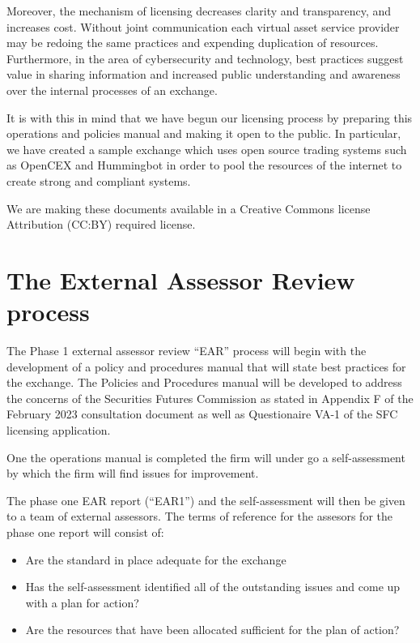 Moreover, the mechanism of licensing decreases clarity and
transparency, and increases cost.  Without joint communication each
virtual asset service provider may be redoing the same practices and
expending duplication of resources.  Furthermore, in the area of
cybersecurity and technology, best practices suggest value in sharing
information and increased public understanding and awareness over the
internal processes of an exchange.

It is with this in mind that we have begun our licensing process by
preparing this operations and policies manual and making it open to
the public.  In particular, we have created a sample exchange which
uses open source trading systems such as OpenCEX and Hummingbot in
order to pool the resources of the internet to create strong and
compliant systems.

We are making these documents available in a Creative Commons license
Attribution (CC:BY) required license.

\section{The External Assessor Review process}

The Phase 1 external assessor review ``EAR'' process will begin with
the development of a policy and procedures manual that will state best
practices for the exchange.  The Policies and Procedures manual will
be developed to address the concerns of the Securities Futures
Commission as stated in Appendix F of the February 2023 consultation
document as well as Questionaire VA-1 of the SFC licensing
application.

One the operations manual is completed the firm will under go a
self-assessment by which the firm will find issues for improvement.

The phase one EAR report (``EAR1'') and the self-assessment will then
be given to a team of external assessors.  The terms of reference for
the assesors for the phase one report will consist of:

\begin{itemize}
\item Are the standard in place adequate for the exchange
  \item Has the self-assessment identified all of the outstanding
    issues and come up with a plan for action?
  \item Are the resources that have been allocated sufficient for the
    plan of action?
\end{itemize}

